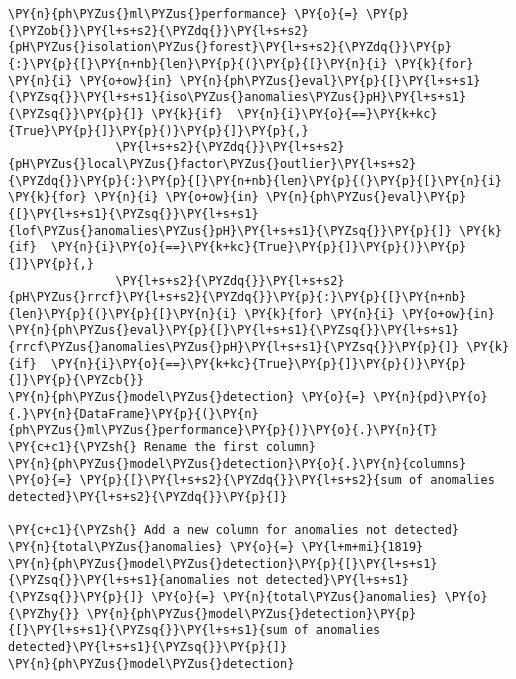     \begin{tcolorbox}[breakable, size=fbox, boxrule=1pt, pad at break*=1mm,colback=cellbackground, colframe=cellborder]
\begin{Verbatim}[commandchars=\\\{\}]
\PY{n}{ph\PYZus{}ml\PYZus{}performance} \PY{o}{=} \PY{p}{\PYZob{}}\PY{l+s+s2}{\PYZdq{}}\PY{l+s+s2}{pH\PYZus{}isolation\PYZus{}forest}\PY{l+s+s2}{\PYZdq{}}\PY{p}{:}\PY{p}{[}\PY{n+nb}{len}\PY{p}{(}\PY{p}{[}\PY{n}{i} \PY{k}{for} \PY{n}{i} \PY{o+ow}{in} \PY{n}{ph\PYZus{}eval}\PY{p}{[}\PY{l+s+s1}{\PYZsq{}}\PY{l+s+s1}{iso\PYZus{}anomalies\PYZus{}pH}\PY{l+s+s1}{\PYZsq{}}\PY{p}{]} \PY{k}{if}  \PY{n}{i}\PY{o}{==}\PY{k+kc}{True}\PY{p}{]}\PY{p}{)}\PY{p}{]}\PY{p}{,}
               \PY{l+s+s2}{\PYZdq{}}\PY{l+s+s2}{pH\PYZus{}local\PYZus{}factor\PYZus{}outlier}\PY{l+s+s2}{\PYZdq{}}\PY{p}{:}\PY{p}{[}\PY{n+nb}{len}\PY{p}{(}\PY{p}{[}\PY{n}{i} \PY{k}{for} \PY{n}{i} \PY{o+ow}{in} \PY{n}{ph\PYZus{}eval}\PY{p}{[}\PY{l+s+s1}{\PYZsq{}}\PY{l+s+s1}{lof\PYZus{}anomalies\PYZus{}pH}\PY{l+s+s1}{\PYZsq{}}\PY{p}{]} \PY{k}{if}  \PY{n}{i}\PY{o}{==}\PY{k+kc}{True}\PY{p}{]}\PY{p}{)}\PY{p}{]}\PY{p}{,}
               \PY{l+s+s2}{\PYZdq{}}\PY{l+s+s2}{pH\PYZus{}rrcf}\PY{l+s+s2}{\PYZdq{}}\PY{p}{:}\PY{p}{[}\PY{n+nb}{len}\PY{p}{(}\PY{p}{[}\PY{n}{i} \PY{k}{for} \PY{n}{i} \PY{o+ow}{in} \PY{n}{ph\PYZus{}eval}\PY{p}{[}\PY{l+s+s1}{\PYZsq{}}\PY{l+s+s1}{rrcf\PYZus{}anomalies\PYZus{}pH}\PY{l+s+s1}{\PYZsq{}}\PY{p}{]} \PY{k}{if}  \PY{n}{i}\PY{o}{==}\PY{k+kc}{True}\PY{p}{]}\PY{p}{)}\PY{p}{]}\PY{p}{\PYZcb{}}
\PY{n}{ph\PYZus{}model\PYZus{}detection} \PY{o}{=} \PY{n}{pd}\PY{o}{.}\PY{n}{DataFrame}\PY{p}{(}\PY{n}{ph\PYZus{}ml\PYZus{}performance}\PY{p}{)}\PY{o}{.}\PY{n}{T}
\PY{c+c1}{\PYZsh{} Rename the first column}
\PY{n}{ph\PYZus{}model\PYZus{}detection}\PY{o}{.}\PY{n}{columns} \PY{o}{=} \PY{p}{[}\PY{l+s+s2}{\PYZdq{}}\PY{l+s+s2}{sum of anomalies detected}\PY{l+s+s2}{\PYZdq{}}\PY{p}{]}

\PY{c+c1}{\PYZsh{} Add a new column for anomalies not detected}
\PY{n}{total\PYZus{}anomalies} \PY{o}{=} \PY{l+m+mi}{1819}
\PY{n}{ph\PYZus{}model\PYZus{}detection}\PY{p}{[}\PY{l+s+s1}{\PYZsq{}}\PY{l+s+s1}{anomalies not detected}\PY{l+s+s1}{\PYZsq{}}\PY{p}{]} \PY{o}{=} \PY{n}{total\PYZus{}anomalies} \PY{o}{\PYZhy{}} \PY{n}{ph\PYZus{}model\PYZus{}detection}\PY{p}{[}\PY{l+s+s1}{\PYZsq{}}\PY{l+s+s1}{sum of anomalies detected}\PY{l+s+s1}{\PYZsq{}}\PY{p}{]}
\PY{n}{ph\PYZus{}model\PYZus{}detection}
\end{Verbatim}
\end{tcolorbox}

